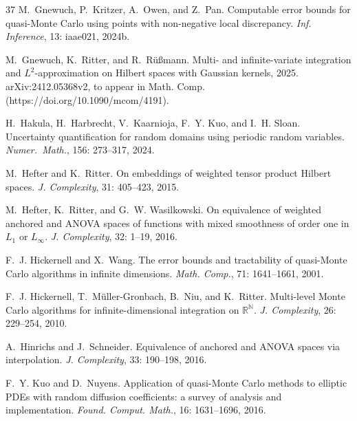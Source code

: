 \documentclass{article}
\newcommand{\N}  {{\mathbb N}}
\theoremstyle{plain}
\theoremstyle{definition}
\begin{document}
\begin{thebibliography}{37}
M.~{Gnewuch}, P.~{Kritzer}, A.~{Owen}, and Z.~{Pan}.
\newblock Computable error bounds for quasi-{M}onte {C}arlo using points with
  non-negative local discrepancy.
\newblock \emph{Inf. Inference}, 13: iaae021, 2024b.

M.~Gnewuch, K.~Ritter, and R.~R\"u{\ss}mann.
\newblock Multi- and infinite-variate integration and {$L^2$}-approximation on
  {H}ilbert spaces with {G}aussian kernels, 2025.
\newblock arXiv:2412.05368v2, to appear in Math. Comp.
  (https://doi.org/10.1090/mcom/4191).

H.~Hakula, H.~Harbrecht, V.~Kaarnioja, F.~Y. Kuo, and I.~H. Sloan.
\newblock Uncertainty quantification for random domains using periodic random
  variables.
\newblock \emph{Numer.\ Math.}, 156: 273--317, 2024.

M.~Hefter and K.~Ritter.
\newblock On embeddings of weighted tensor product {H}ilbert spaces.
\newblock \emph{J. Complexity}, 31: 405--423, 2015.

M.~Hefter, K.~Ritter, and G.~W. Wasilkowski.
\newblock On equivalence of weighted anchored and {ANOVA} spaces of functions
  with mixed smoothness of order one in ${L}_1$ or ${L}_\infty$.
\newblock \emph{J. Complexity}, 32: 1--19, 2016.

F.~J. Hickernell and X.~Wang.
\newblock The error bounds and tractability of quasi-{M}onte {C}arlo algorithms
  in infinite dimensions.
\newblock \emph{Math. Comp.}, 71: 1641--1661, 2001.

F.~J. Hickernell, T.~M{\"u}ller-Gronbach, B.~Niu, and K.~Ritter.
\newblock Multi-level {M}onte {C}arlo algorithms for infinite-dimensional
  integration on $\mathbb{R}^{\N}$.
\newblock \emph{J. Complexity}, 26: 229--254, 2010.

A.~Hinrichs and J.~Schneider.
\newblock Equivalence of anchored and {ANOVA} spaces via interpolation.
\newblock \emph{J. Complexity}, 33: 190--198, 2016.

F.~Y. Kuo and D.~Nuyens.
\newblock Application of quasi-{M}onte {C}arlo methods to elliptic {PDE}s with
  random diffusion coefficients: a survey of analysis and implementation.
\newblock \emph{Found. Comput. Math.}, 16: 1631--1696, 2016.


\end{thebibliography}
\end{document}
